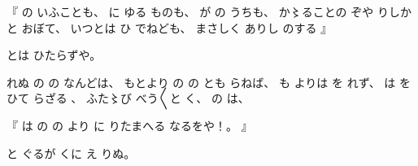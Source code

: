 %
『
の
いふことも、
%
に
ゆる
ものも、
%
が
の%
うちも、
%
か〻ることの%
ぞや
りしかと
おぼ{}て、
%
いつとは
ひ
でねども、
%
まさしく
ありし
のする%
』

%
とは
ひたらずや。

%
れぬ
の
の
なんどは、
%
もとより
の
の
とも
らねば、
%
も
よりは
を
れず、
%
は
を
ひて
らざる
、
%
ふた〻び%
べう〳〵と
く、
%
の
は、

%
『
は
の
の
より
に
りたまへる
なるをや！。
』

%
と
ぐるが
くに
え
りぬ。
